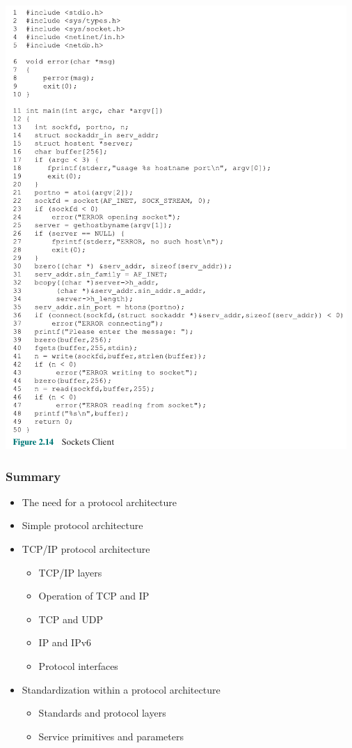 \documentclass[pdflatex,compress]{beamer}
\begin{document}
\begin{frame}
	\begin{center}
		\includegraphics[height=0.9\textheight]{img/img19}
	\end{center}
\end{frame}

\begin{frame}
	\frametitle{Summary}
	\begin{itemize}
		\item The need for a protocol architecture
		\item Simple protocol architecture
		\item TCP/IP protocol architecture
		\begin{itemize}
			\item TCP/IP layers
			\item Operation of TCP and IP
			\item TCP and UDP
			\item IP and IPv6
			\item Protocol interfaces
		\end{itemize}
		\item Standardization within a protocol architecture
		\begin{itemize}
			\item Standards and protocol layers
			\item Service primitives and
			parameters
		\end{itemize}
	\end{itemize}
\end{frame}
\end{document}
